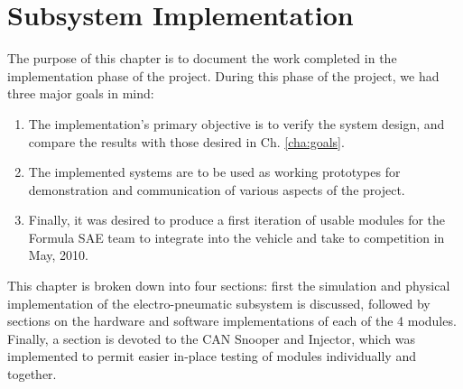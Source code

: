 \chapter{Subsystem Implementation\label{cha:implementation}}

The purpose of this chapter is to document the work completed in the implementation phase of the project. During this phase of the project, we had three major goals in mind:
\begin{enumerate}
  \item The implementation's primary objective is to verify the system design, and compare the results with those desired in Ch. \ref{cha:goals}.
  \item The implemented systems are to be used as working prototypes for demonstration and communication of various aspects of the project.
  \item Finally, it was desired to produce a first iteration of usable modules for the Formula SAE team to integrate into the vehicle and take to competition in May, 2010.
\end{enumerate}

This chapter is broken down into four sections: first the simulation and physical implementation of the electro-pneumatic subsystem is discussed, followed by sections on the hardware and software implementations of each of the 4 modules. Finally, a section is devoted to the CAN Snooper and Injector, which was implemented to permit easier in-place testing of modules individually and together.















